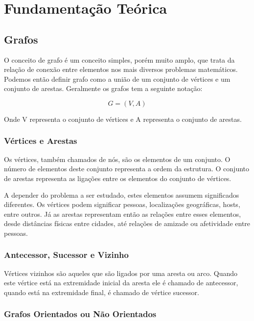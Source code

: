 \chapter{Fundamentação Teórica}

\section{Grafos}

O conceito de grafo é um conceito simples, porém muito amplo, que trata da relação de conexão entre elementos nos mais diversos problemas matemáticos. Podemos então definir grafo como a união de um conjunto de vértices e um conjunto de arestas. Geralmente os grafos tem a seguinte notação:

\begin{equation}
G = (V,A)
\end{equation}

Onde V representa o conjunto de vértices e A representa o conjunto de arestas.

\subsection{Vértices e Arestas }

Os vértices, também chamados de nós, são os elementos de um conjunto.   O número de elementos deste conjunto representa a ordem da estrutura. O conjunto de arestas representa as ligações entre os elementos do conjunto de vértices.

A depender do problema a ser estudado, estes elementos assumem significados diferentes. Os vértices podem significar pessoas, localizações geográficas, hosts, entre outros. Já as arestas representam então as relações entre esses elementos, desde distâncias físicas entre cidades, até relações de amizade ou afetividade entre pessoas.

\subsection{Antecessor, Sucessor e Vizinho}

Vértices vizinhos são aqueles que são ligados por uma aresta ou arco. Quando este vértice está na extremidade inicial da aresta ele é chamado de antecessor, quando está na extremidade final, é chamado de vértice sucessor.

\subsection{Grafos Orientados ou Não Orientados}

